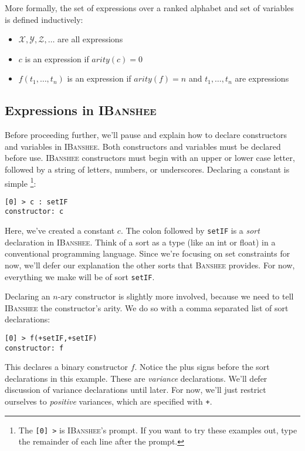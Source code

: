 \documentclass{article}
\newcommand{\banshee}{\textsc{Banshee}}
\newcommand{\ibanshee}{\textsc{IBanshee}}
\newcommand{\var}[1]{\mathcal{#1}}
\begin{document}
More formally, the set of expressions over a ranked alphabet and set of
variables is defined inductively:
\begin{itemize}
\item $\var{X},\var{Y},\var{Z},\ldots$ are all expressions
\item $c$ is an expression if $arity(c) = 0$
\item $f(t_1,\ldots,t_n)$ is an expression if $arity(f) = n$ and
  $t_1,\ldots,t_n$ are expressions
\end{itemize}

\subsection{Expressions in \ibanshee{}}

Before proceeding further, we'll pause and explain how to declare
constructors and variables in \ibanshee{}. Both constructors and
variables must be declared before use. \ibanshee{} constructors
must begin with an upper or lower case letter, followed by a string of
letters, numbers, or underscores. Declaring a constant is
simple \footnote{The \texttt{[0] >} is \ibanshee{}'s prompt. If you
  want to try these examples out, type the remainder of each line
  after the prompt.}:

\begin{verbatim}
[0] > c : setIF
constructor: c
\end{verbatim}
Here, we've created a constant $c$. The colon followed by
\texttt{setIF} is a \emph{sort} declaration in \ibanshee{}. Think of a
sort as a type (like an int or float) in a conventional programming
language. Since we're focusing on set constraints for now, we'll defer
our explanation the other sorts that \banshee{} provides. For now,
everything we make will be of sort \texttt{setIF}.

Declaring an $n$-ary constructor is slightly more involved, because we
need to tell \ibanshee{} the constructor's arity. We do so with a
comma separated list of sort declarations:

\begin{verbatim}
[0] > f(+setIF,+setIF)
constructor: f
\end{verbatim}

This declares a binary constructor $f$. Notice the plus signs before
the sort declarations in this example. These are \emph{variance}
declarations. We'll defer discussion of variance declarations until
later. For now, we'll just restrict ourselves to \emph{positive}
variances, which are specified with \texttt{+}.
\end{document}
